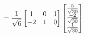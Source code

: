 \documentclass[preview]{standalone}
\begin{document}
\begin{align*}
\special{dvisvgm:raw <g id='unique000'>}= \frac{1}{\sqrt{6}} \begin{bmatrix} 1 & 0 & 1 \\ -2 & 1 & 0 \end{bmatrix}\begin{bmatrix} \frac{5}{\sqrt{30}} \\ \frac{-2}{\sqrt{30}} \\ \frac{1}{\sqrt{30}} \end{bmatrix}\special{dvisvgm:raw </g>}
\end{align*}
\end{document}
